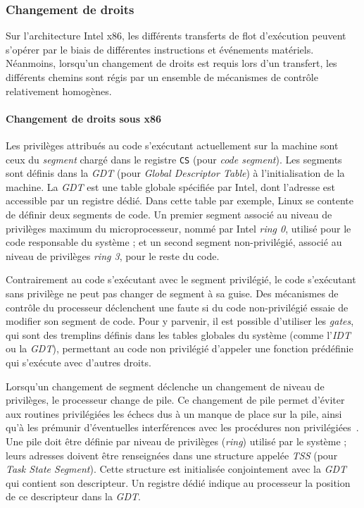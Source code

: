 			\subsubsection{Changement de droits}

Sur l'architecture Intel x86, les différents transferts de flot d'exécution peuvent s'opérer par le biais de différentes instructions et événements matériels. Néanmoins, lorsqu'un changement de droits est requis lors d'un transfert, les différents chemins sont régis par un ensemble de mécanismes de contrôle relativement homogènes.

\paragraph{Changement de droits sous x86}
\label{ring}

Les privilèges attribués au code s'exécutant actuellement sur la machine sont ceux du \emph{segment} chargé dans le registre \texttt{CS} (pour \emph{code segment}). Les segments sont définis dans la \emph{GDT} (pour \emph{Global Descriptor Table}) à l'initialisation de la machine. La \emph{GDT} est une table globale spécifiée par Intel, dont l'adresse est accessible par un registre dédié. Dans cette table par exemple, Linux se contente de définir deux segments de code. Un premier segment associé au niveau de privilèges maximum du microprocesseur, nommé par Intel \emph{ring 0}, utilisé pour le code responsable du système ; et un second segment non-privilégié, associé au niveau de privilèges \emph{ring 3}, pour le reste du code. 

Contrairement au code s'exécutant avec le segment privilégié, le code s'exécutant sans privilège ne peut pas changer de segment à sa guise. Des mécanismes de contrôle du processeur déclenchent une faute si du code non-privilégié essaie de modifier son segment de code. Pour y parvenir, il est possible d'utiliser les \emph{gates}, qui sont des tremplins définis dans les tables globales du système (comme l'\emph{IDT} ou la \emph{GDT}), permettant au code non privilégié d'appeler une fonction prédéfinie qui s'exécute avec d'autres droits.

Lorsqu'un changement de segment déclenche un changement de niveau de privilèges, le processeur change de pile. Ce changement de pile permet d'éviter aux routines privilégiées les échecs dus à un manque de place sur la pile, ainsi qu'à les prémunir d'éventuelles interférences avec les procédures non privilégiées~\cite{intel_stack_switch}. 
Une pile doit être définie par niveau de privilèges (\emph{ring}) utilisé par le système ; leurs adresses doivent être renseignées dans une structure appelée \emph{TSS} (pour \emph{Task State Segment}). Cette structure est initialisée conjointement avec la \emph{GDT} qui contient son descripteur. Un registre dédié indique au processeur la position de ce descripteur dans la \emph{GDT}.

